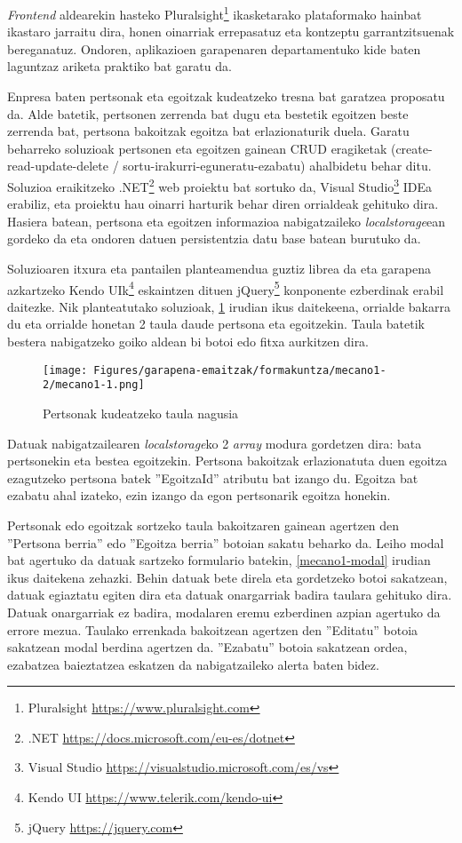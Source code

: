 \textit{Frontend} aldearekin hasteko Pluralsight\footnote{Pluralsight \url{https://www.pluralsight.com}} ikasketarako plataformako hainbat ikastaro jarraitu
dira, honen oinarriak errepasatuz eta kontzeptu garrantzitsuenak bereganatuz. Ondoren, aplikazioen garapenaren departamentuko kide baten laguntzaz ariketa praktiko bat garatu da. 

Enpresa baten pertsonak eta egoitzak kudeatzeko tresna bat garatzea proposatu da. Alde batetik,
pertsonen zerrenda bat dugu eta bestetik egoitzen beste zerrenda bat, pertsona bakoitzak egoitza
bat erlazionaturik duela. Garatu beharreko soluzioak pertsonen eta egoitzen gainean CRUD
eragiketak (create-read-update-delete / sortu-irakurri-eguneratu-ezabatu) ahalbidetu behar ditu.
Soluzioa eraikitzeko .NET\footnote{.NET \url{https://docs.microsoft.com/eu-es/dotnet}} web proiektu bat sortuko da, Visual Studio\footnote{Visual Studio \url{https://visualstudio.microsoft.com/es/vs}} IDEa erabiliz, eta proiektu
hau oinarri harturik behar diren orrialdeak gehituko dira. Hasiera batean, pertsona eta 
egoitzen informazioa nabigatzaileko \textit{localstorage}ean gordeko da eta ondoren datuen persistentzia
datu base batean burutuko da. 

Soluzioaren itxura eta pantailen planteamendua guztiz librea da eta garapena azkartzeko Kendo UIk\footnote{Kendo UI \url{https://www.telerik.com/kendo-ui}}
eskaintzen dituen jQuery\footnote{jQuery \url{https://jquery.com}} konponente ezberdinak erabil daitezke. Nik planteatutako soluzioak, \ref{mecano1-table} irudian ikus daitekeena, orrialde
bakarra du eta orrialde honetan 2 taula daude pertsona eta egoitzekin. Taula batetik bestera nabigatzeko
goiko aldean bi botoi edo fitxa aurkitzen dira. 

\begin{figure}[H]
\centering
\texttt{[image: Figures/garapena-emaitzak/formakuntza/mecano1-2/mecano1-1.png]}
\caption{Pertsonak kudeatzeko taula nagusia}
\label{mecano1-table}
\end{figure}

Datuak nabigatzailearen \textit{localstorage}ko 2 \textit{array} modura gordetzen dira: bata pertsonekin eta bestea
egoitzekin. Pertsona bakoitzak erlazionatuta duen egoitza ezagutzeko pertsona batek ''EgoitzaId'' atributu
bat izango du. Egoitza bat ezabatu ahal izateko, ezin izango da egon pertsonarik egoitza honekin.

Pertsonak edo egoitzak sortzeko taula bakoitzaren gainean agertzen den ''Pertsona berria'' edo ''Egoitza
berria'' botoian sakatu beharko da. Leiho modal bat agertuko da datuak sartzeko formulario batekin, \ref{mecano1-modal} irudian ikus daitekena zehazki. Behin
datuak bete direla eta gordetzeko botoi sakatzean, datuak egiaztatu egiten dira eta datuak onargarriak badira
taulara gehituko dira. Datuak onargarriak ez badira, modalaren eremu ezberdinen azpian agertuko da
errore mezua. Taulako errenkada bakoitzean agertzen den ''Editatu'' botoia sakatzean modal  berdina
agertzen da. ''Ezabatu'' botoia sakatzean ordea, ezabatzea baieztatzea eskatzen da nabigatzaileko alerta
baten bidez.

